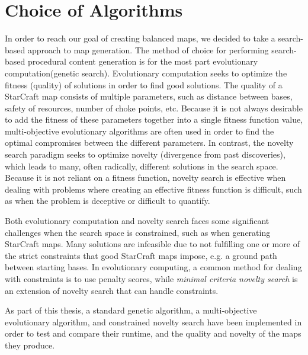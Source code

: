 \section{Choice of Algorithms}
\label{methodology_algorithmchoice}
In order to reach our goal of creating balanced maps, we decided to take a search-based approach to map generation. The method of choice for performing search-based procedural content generation is for the most part evolutionary computation\cite{togelius2011search}(genetic search). Evolutionary computation seeks to optimize the fitness (quality) of solutions in order to find good solutions. The quality of a StarCraft map consists of multiple parameters, such as distance between bases, safety of resources, number of choke points, etc. Because it is not always desirable to add the fitness of these parameters together into a single fitness function value, multi-objective evolutionary algorithms are often used in order to find the optimal compromises between the different parameters. In contrast, the novelty search paradigm seeks to optimize novelty (divergence from past discoveries), which leads to many, often radically, different solutions in the search space. Because it is not reliant on a fitness function, novelty search is effective when dealing with problems where creating an effective fitness function is difficult, such as when the problem is deceptive or difficult to quantify.

Both evolutionary computation and novelty search faces some significant challenges when the search space is constrained\cite{liapis2014constrained}, such as when generating StarCraft maps. Many solutions are infeasible due to not fulfilling one or more of the strict constraints that good StarCraft maps impose, e.g. a ground path between starting bases. In evolutionary computing, a common method for dealing with constraints is to use penalty scores, while \textit{minimal criteria novelty search} is an extension of novelty search that can handle constraints.

As part of this thesis, a standard genetic algorithm, a multi-objective evolutionary algorithm, and constrained novelty search have been implemented in order to test and compare their runtime, and the quality and novelty of the maps they produce.